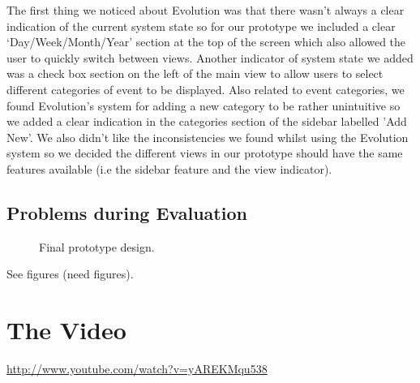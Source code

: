 \documentclass{article}
\begin{document}
The first thing we noticed about Evolution was that there wasn't always
a clear indication of the current system state so for our prototype we
included a clear `Day/Week/Month/Year' section at the top of the screen
which also allowed the user to quickly switch between views. Another
indicator of system state we added was a check box section on the left of
the main view to allow users to select different categories of event to
be displayed. Also related to event categories, we found Evolution's
system for adding a new category to be rather unintuitive so we added a
clear indication in the categories section of the sidebar labelled
'Add New'. We also didn't like the inconsistencies we found whilst
using the Evolution system so we decided the different views in our
prototype should have the same features available (i.e the sidebar
feature and the view indicator).

\subsection{Problems during Evaluation}

\begin{figure}
\centering
\vspace{-50mm}
\caption{Final prototype design.}
\label{fig:ffp}
\end{figure}


See figures (need figures).
\section{The Video}

\url{http://www.youtube.com/watch?v=yAREKMqu538}

\end{document}
